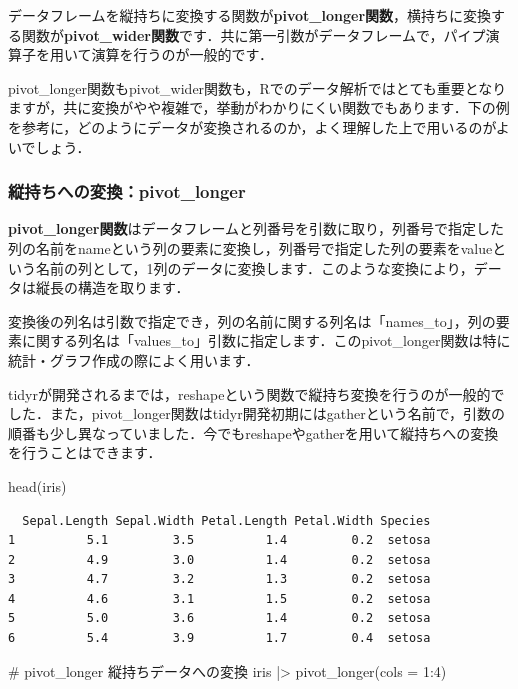\documentclass[
  letterpaper,
  DIV=11,
  numbers=noendperiod]{scrreprt}
\newenvironment{Shaded}{\begin{snugshade}}{\end{snugshade}}
\newcommand{\AttributeTok}[1]{\textcolor[rgb]{0.40,0.45,0.13}{#1}}
\newcommand{\CommentTok}[1]{\textcolor[rgb]{0.37,0.37,0.37}{#1}}
\newcommand{\DecValTok}[1]{\textcolor[rgb]{0.68,0.00,0.00}{#1}}
\newcommand{\FunctionTok}[1]{\textcolor[rgb]{0.28,0.35,0.67}{#1}}
\newcommand{\NormalTok}[1]{\textcolor[rgb]{0.00,0.23,0.31}{#1}}
\newcommand{\SpecialCharTok}[1]{\textcolor[rgb]{0.37,0.37,0.37}{#1}}
\begin{document}
データフレームを縦持ちに変換する関数が\textbf{pivot\_longer関数}，横持ちに変換する関数が\textbf{pivot\_wider関数}です．共に第一引数がデータフレームで，パイプ演算子を用いて演算を行うのが一般的です．

pivot\_longer関数もpivot\_wider関数も，Rでのデータ解析ではとても重要となりますが，共に変換がやや複雑で，挙動がわかりにくい関数でもあります．下の例を参考に，どのようにデータが変換されるのか，よく理解した上で用いるのがよいでしょう．

\hypertarget{ux7e26ux6301ux3061ux3078ux306eux5909ux63dbpivot_longer}{%
\subsubsection{縦持ちへの変換：pivot\_longer}\label{ux7e26ux6301ux3061ux3078ux306eux5909ux63dbpivot_longer}}

\textbf{pivot\_longer関数}はデータフレームと列番号を引数に取り，列番号で指定した列の名前をnameという列の要素に変換し，列番号で指定した列の要素をvalueという名前の列として，1列のデータに変換します．このような変換により，データは縦長の構造を取ります．

変換後の列名は引数で指定でき，列の名前に関する列名は「names\_to」，列の要素に関する列名は「values\_to」引数に指定します．このpivot\_longer関数は特に統計・グラフ作成の際によく用います．

tidyrが開発されるまでは，reshapeという関数で縦持ち変換を行うのが一般的でした．また，pivot\_longer関数はtidyr開発初期にはgatherという名前で，引数の順番も少し異なっていました．今でもreshapeやgatherを用いて縦持ちへの変換を行うことはできます．

\begin{Shaded}
\begin{Highlighting}[]
\FunctionTok{head}\NormalTok{(iris)}
\end{Highlighting}
\end{Shaded}

\begin{verbatim}
  Sepal.Length Sepal.Width Petal.Length Petal.Width Species
1          5.1         3.5          1.4         0.2  setosa
2          4.9         3.0          1.4         0.2  setosa
3          4.7         3.2          1.3         0.2  setosa
4          4.6         3.1          1.5         0.2  setosa
5          5.0         3.6          1.4         0.2  setosa
6          5.4         3.9          1.7         0.4  setosa
\end{verbatim}

\begin{Shaded}
\begin{Highlighting}[]
\CommentTok{\# pivot\_longer 縦持ちデータへの変換}
\NormalTok{iris }\SpecialCharTok{|\textgreater{}} \FunctionTok{pivot\_longer}\NormalTok{(}\AttributeTok{cols =} \DecValTok{1}\SpecialCharTok{:}\DecValTok{4}\NormalTok{) }
\end{Highlighting}
\end{Shaded}
\end{document}
